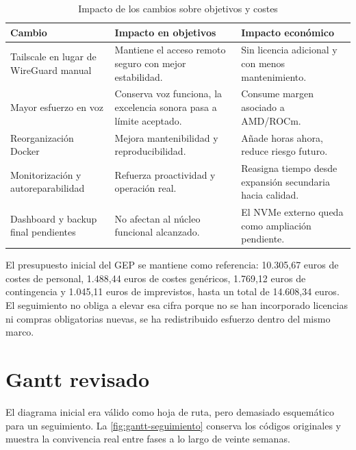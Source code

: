 \begin{table}[H]
  \centering
  \caption{Impacto de los cambios sobre objetivos y costes}
  \label{tab:impacto-objetivos-costes}
  \begin{tabularx}{\textwidth}{lXX}
    \toprule
    Cambio & Impacto en objetivos & Impacto económico \\
    \midrule
    Tailscale en lugar de WireGuard manual & Mantiene el acceso remoto seguro con mejor estabilidad. & Sin licencia adicional y con menos mantenimiento. \\
    Mayor esfuerzo en voz & Conserva voz funciona, la excelencia sonora pasa a límite aceptado. & Consume margen asociado a AMD/ROCm. \\
    Reorganización Docker & Mejora mantenibilidad y reproducibilidad. & Añade horas ahora, reduce riesgo futuro. \\
    Monitorización y autoreparabilidad & Refuerza proactividad y operación real. & Reasigna tiempo desde expansión secundaria hacia calidad. \\
    Dashboard y backup final pendientes & No afectan al núcleo funcional alcanzado. & El NVMe externo queda como ampliación pendiente. \\
    \bottomrule
  \end{tabularx}
\end{table}

El presupuesto inicial del GEP se mantiene como referencia: 10.305,67 euros de costes de personal, 1.488,44 euros de costes genéricos, 1.769,12 euros de contingencia y 1.045,11 euros de imprevistos, hasta un total de 14.608,34 euros. El seguimiento no obliga a elevar esa cifra porque no se han incorporado licencias ni compras obligatorias nuevas, se ha redistribuido esfuerzo dentro del mismo marco.

\section{Gantt revisado}
El diagrama inicial era válido como hoja de ruta, pero demasiado esquemático para un seguimiento. La \cref{fig:gantt-seguimiento} conserva los códigos originales y muestra la convivencia real entre fases a lo largo de veinte semanas.


